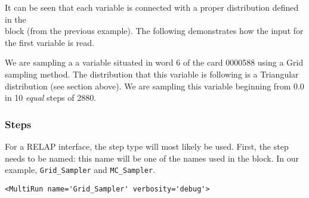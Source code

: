 It can be seen that each variable is connected with a proper distribution
defined in the \\ block (from the previous example).
%
The following demonstrates how the input for the first variable is read.

We are sampling a a variable situated in word 6 of the card 0000588 using a Grid
sampling method.
%
The distribution that this variable is following is a Triangular distribution
(see section above).
%
We are sampling this variable beginning from 0.0 in 10 \textit{equal} steps of
2880.
%
\subsubsection{Steps}
For a RELAP interface, the  step type will most likely be
used.
%
First, the step needs to be named: this name will be one of the names used in
the  block.
%
In our example, \texttt{Grid\_Sampler} and \texttt{MC\_Sampler}.
%
\begin{lstlisting}[style=XML,morekeywords={name,debug,re-seeding}]
     <MultiRun name='Grid_Sampler' verbosity='debug'>
\end{lstlisting}

